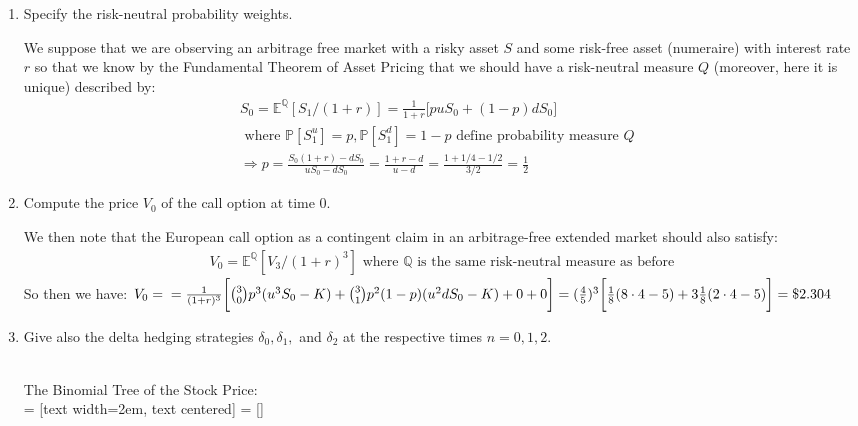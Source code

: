 \documentclass[12pt,twoside, letter]{exam}
\theoremstyle{definition}
\newcommand{\ee}{\mathbb{E}}
\newcommand{\pp}{\mathbb{P}}
\begin{document}
\begin{enumerate}
  \item Specify the risk-neutral probability weights.
    \begin{solution}
      We suppose that we are observing an arbitrage free market with a risky asset $S$ and some risk-free asset (numeraire) with interest rate $r$
      so that we know by the Fundamental Theorem of Asset Pricing that we should have a risk-neutral measure $Q$ (moreover, here it is unique) described
      by:
        \begin{align*}
          S_0 = \ee^\mathbb{Q}[S_1/(1+r)] = \frac{1}{1+r}\big[ puS_0 + (1-p)dS_0\big] \\
          \text{ where $\pp[S_1^u] = p, \pp[S_1^d] = 1-p$ define probability measure $Q$ } \\
          \Rightarrow p = \frac{S_0(1+r) - dS_0}{uS_0 - dS_0} = \frac{1 + r - d}{u - d} = \frac{1+1/4-1/2}{3/2} = \frac{1}{2}
        \end{align*}
    \end{solution}
  \item Compute the price $V_0$ of the call option at time 0.
    \begin{solution}
      We then note that the European call option as a contingent claim in an arbitrage-free extended market should also satisfy:
        \begin{align*}
          V_0 = \ee^\mathbb{Q}[V_3/(1+r)^3] \text{ where $\mathbb{Q}$ is the same risk-neutral measure as before}
        \end{align*}
        So then we have:
      $V_0 = \\
      = \frac{1}{(1+r)^3}\bigg[  {3 \choose 0}p^3(u^3S_0-K) +  {3 \choose 1}p^2(1-p)(u^2dS_0 - K) + 0 + 0 \bigg] \\
      = (\frac{4}{5})^3\bigg[\frac{1}{8}(8\cdot4 - 5) +3\frac{1}{8}(2\cdot4 - 5) \bigg] = \$2.304$
    \end{solution}
  \item Give also the delta hedging strategies $\delta_0, \delta_1,$ and $\delta_2$ at the respective times $n=0,1,2$.
    \begin{solution}\\
      The Binomial Tree of the Stock Price:\\
       = [text width=2em, text centered]
       = []
\end{solution}
\end{enumerate}
\end{document}

